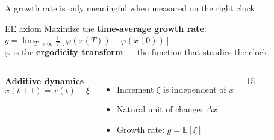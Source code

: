 \begin{frame}{A growth rate is only meaningful when measured on the right clock}

\begin{block}{EE axiom}
\small\centering
Maximize the \textbf{time-average growth rate}:
$g = \lim_{T\to\infty}\tfrac{1}{T}\left[\varphi\!\left(x(T)\right)-\varphi\!\left(x(0)\right)\right]$\\[0.15em]
{\footnotesize $\varphi$ is the \textbf{ergodicity transform} — the function that steadies the clock.}
\end{block}

\vspace{0.3em}
\begin{columns}[T]
\textbf{Additive dynamics}
\[ x(t+1) = x(t) + \xi \]
\begin{itemize}\setlength\itemsep{3pt}
  \item Increment $\xi$ is independent of $x$
  \item Natural unit of change: $\Delta x$
  \item Growth rate: $g = \mathbb{E}[\xi]$
\end{itemize}
\vspace{0.2em}
\begin{center}
\begin{animateinline}[loop,autoplay,controls=none]{15}%
%
\end{animateinline}
\end{center}


\end{columns}
\end{frame}
